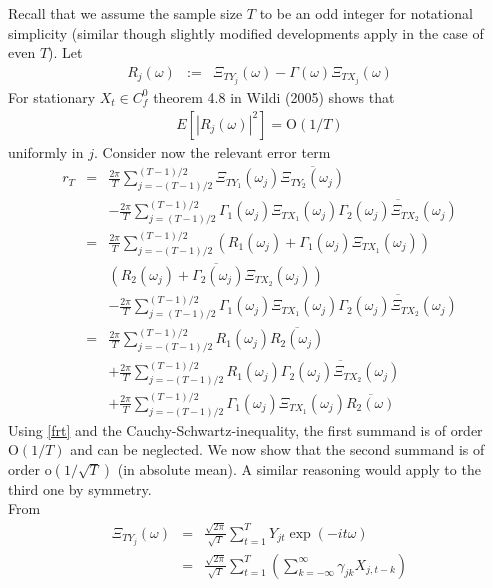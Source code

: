 \documentclass[11pt]{article}
\begin{document}
\begin{appendix}
Recall that we assume the sample size $T$ to be an odd integer for
notational simplicity (similar though slightly modified developments
apply in the case of even $T$). Let
\begin{eqnarray*}
R_{j}(\omega)&:=&\Xi_{TY_j}(\omega)-\Gamma(\omega)\Xi_{TX_j}(\omega)
\end{eqnarray*}
For stationary $X_t\in C_f^0$   theorem 4.8 in Wildi (2005) 
shows that
\begin{eqnarray}\label{frt}
E[|R_{j}(\omega)|^2]=\textrm{O}(1/{T})
\end{eqnarray}
uniformly in $j$. Consider now the relevant error term
\begin{eqnarray}
r_T&=&\frac{2\pi}{T}\sum_{j=-(T-1)/2}^{(T-1)/2}\Xi_{TY_1}(\omega_j)\overline{\Xi_{TY_2}(\omega_j)}\nonumber\\
&&-\frac{2\pi}{T}\sum_{j=(T-1)/2}^{(T-1)/2}\Gamma_1(\omega_j)\Xi_{TX_1}(\omega_j)
    \overline{\Gamma_2(\omega_j)\Xi_{TX_2}(\omega_j)}\nonumber\\
&=&\frac{2\pi}{T}\sum_{j=-(T-1)/2}^{(T-1)/2}\left(R_1(\omega_j)+\Gamma_1(\omega_j)\Xi_{TX_1}(\omega_j)\right)\nonumber\\
&&\overline{\left(R_2(\omega_j)+\Gamma_2(\omega_j)\Xi_{TX_2}(\omega_j)\right)}\nonumber\\
&&-\frac{2\pi}{T}\sum_{j=(T-1)/2}^{(T-1)/2}\Gamma_1(\omega_j)\Xi_{TX_1}(\omega_j)
    \overline{\Gamma_2(\omega_j)\Xi_{TX_2}(\omega_j)}\nonumber\\
&=&\frac{2\pi}{T}\sum_{j=-(T-1)/2}^{(T-1)/2}R_1(\omega_j)\overline{R_2(\omega_j)}\nonumber\\
&&+\frac{2\pi}{T}\sum_{j=-(T-1)/2}^{(T-1)/2}R_1(\omega_j)
\overline{\Gamma_2(\omega_j)\Xi_{TX_2}(\omega_j)}\label{ssp}\\
&&+\frac{2\pi}{T}\sum_{j=-(T-1)/2}^{(T-1)/2}\Gamma_1(\omega_j)\Xi_{TX_1}(\omega_j)\overline{R_2(\omega)}\nonumber
\end{eqnarray}
Using \ref{frt} and the Cauchy-Schwartz-inequality, the first
summand is of order $\textrm{O}(1/T)$ and can be neglected. We now
show that the second summand is of order $\textrm{o}(1/\sqrt{T})$
(in absolute mean). A similar reasoning would apply to the third one
by symmetry. \\
From
\begin{eqnarray}
\Xi_{TY_j}(\omega)&=&\frac{\sqrt{2\pi}}{\sqrt{T}}\sum_{t=1}^TY_{jt}\exp(-it \omega )\nonumber\\
&=&\frac{\sqrt{2\pi}}{\sqrt{T}}\sum_{t=1}^T
\left(\sum_{k=-\infty}^{\infty}\gamma_{jk} X_{j,t-k} \right)

\end{eqnarray}
\end{appendix}
\end{document}
